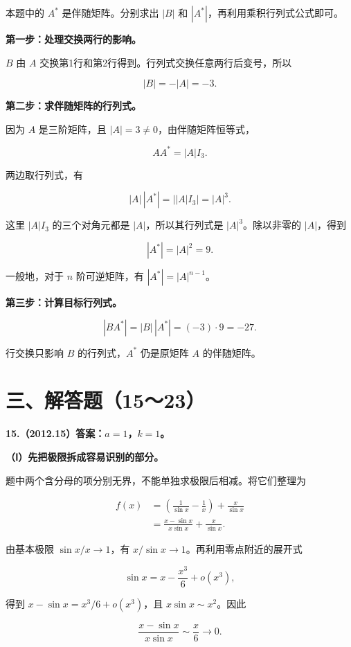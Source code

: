 \documentclass[UTF8,11pt,fontset=windows]{ctexart}
\begin{document}
本题中的 $A^*$ 是伴随矩阵。分别求出 $|B|$ 和 $|A^*|$，再利用乘积行列式公式即可。

\textbf{第一步：处理交换两行的影响。}

$B$ 由 $A$ 交换第1行和第2行得到。行列式交换任意两行后变号，所以

$$
|B|=-|A|=-3.
$$

\textbf{第二步：求伴随矩阵的行列式。}

因为 $A$ 是三阶矩阵，且 $|A|=3\ne0$，由伴随矩阵恒等式，

$$
AA^*=|A|I_3.
$$

两边取行列式，有

$$
|A|\,|A^*|
=\big||A|I_3\big|
=|A|^3.
$$

这里 $|A|I_3$ 的三个对角元都是 $|A|$，所以其行列式是 $|A|^3$。除以非零的 $|A|$，得到

$$
|A^*|=|A|^2=9.
$$

一般地，对于 $n$ 阶可逆矩阵，有 $|A^*|=|A|^{n-1}$。

\textbf{第三步：计算目标行列式。}

$$
|BA^*|=|B|\,|A^*|=(-3)\cdot9=-27.
$$

行交换只影响 $B$ 的行列式，$A^*$ 仍是原矩阵 $A$ 的伴随矩阵。

\clearpage

\section*{三、解答题（15～23）}

\textbf{15.（2012.15）答案：$a=1$，$k=1$。}

\textbf{（Ⅰ）先把极限拆成容易识别的部分。}

题中两个含分母的项分别无界，不能单独求极限后相减。将它们整理为

$$
\begin{aligned}
f(x)
&=\left(\frac1{\sin x}-\frac1x\right)+\frac{x}{\sin x}\\
&=\frac{x-\sin x}{x\sin x}+\frac{x}{\sin x}.
\end{aligned}
$$

由基本极限 $\sin x/x\to1$，有 $x/\sin x\to1$。再利用零点附近的展开式

$$
\sin x=x-\frac{x^3}{6}+o(x^3),
$$

得到 $x-\sin x=x^3/6+o(x^3)$，且 $x\sin x\sim x^2$。因此

$$
\frac{x-\sin x}{x\sin x}\sim\frac{x}{6}\longrightarrow0.
$$
\end{document}
